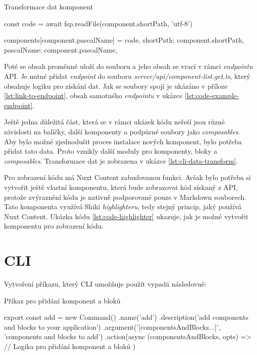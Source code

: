 \clearpage

\begin{listing}[H]
    \caption{Transformace dat komponent}
    \label{lst:module}
    \begin{code}
const code = await fsp.readFile(component.shortPath, 'utf-8')

components[component.pascalName] = {
    code,
    shortPath: component.shortPath,
    pascalName: component.pascalName,
}
\end{code}
\end{listing}

Poté se obsah proměnné uloží do souboru a jeho obsah se vrací v rámci \emph{endpointu} API. Je nutné přidat \emph{endpoint} do souboru \emph{server/api/component-list.get.ts}, který obsahuje logiku pro získání dat. Jak se soubory spojí je ukázáno v příloze \ref{lst:link-to-endpoint}, obsah samotného \emph{endpointu} v ukázce \ref{lst:code-example-endpoint}.

Ještě jedna důležitá část, která se v rámci ukázek kódu neřeší jsou různé závislosti na balíčky, další komponenty a podpůrné soubory jako \emph{composables}. Aby bylo možné zjednodušit proces instalace nových komponent, bylo potřeba přidat tato data. Proto vznikly další moduly pro komponenty, bloky a \emph{composables}. Transformace dat je zobrazena v ukázce \ref{lst:cli-data-transform}.

Pro zobrazení kódu má Nuxt Content zabudovanou funkci. \cite{NuxtContentCodeHighlighting} Avšak bylo potřeba si vytvořit ještě vlastní komponentu, která bude zobrazovat kód získaný z API, protože zvýraznění kódu je nativně podporované pouze v Markdown souborech. Tato komponenta využívá Shiki \emph{highlighteru}, tedy stejný princip, jaký používá Nuxt Content. Ukázka kódu \ref{lst:code-highlighter} ukazuje, jak je možné vytvořit komponentu pro zobrazení kódu.

\section{CLI}
Vytvoření příkazu, který CLI umožňuje použít vypadá následovně:

\begin{listing}[H]
    \caption{Příkaz pro přidání komponent a bloků}
    \label{lst:cli-install}
    \begin{code}
export const add = new Command()
.name('add')
.description('add components and blocks to your application')
.argument('[componentsAndBlocks...]', 'components and blocks to add')
.action(async (componentsAndBlocks, opts) => {
    // Logika pro přidání komponent a bloků
})        
\end{code}
\end{listing}


